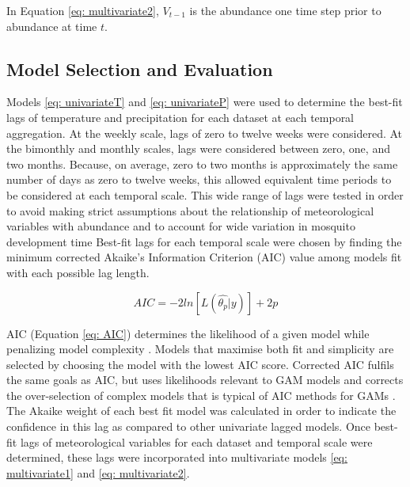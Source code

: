 In Equation \ref{eq: multivariate2}, $V_{t-1}$ is the abundance one time step prior to abundance at time $t$. 


\subsection{Model Selection and Evaluation}

Models \ref{eq: univariateT} and \ref{eq: univariateP} were used to determine the best-fit lags of temperature and precipitation for each dataset at each temporal aggregation. At the weekly scale, lags of zero to twelve weeks were considered. At the bimonthly and monthly scales, lags were considered between zero, one, and two months. Because, on average, zero to two months is approximately the same number of days as zero to twelve weeks, this allowed equivalent time periods to be considered at each temporal scale. This wide range of lags were tested in order to avoid making strict assumptions about the relationship of meteorological variables with abundance and to account for wide variation in mosquito development time \citep{Barrera1996, Beck-Johnson2013} Best-fit lags for each temporal scale were chosen by finding the minimum corrected Akaike's Information Criterion (AIC) value among models fit with each possible lag length. 

\begin{equation}
	AIC = -2ln[L(\hat{\theta_{p}}|y)] + 2p
	\label{eq: AIC}
\end{equation}




AIC (Equation \ref{eq: AIC}) determines the likelihood of a given model while penalizing model complexity \citep{JOHNSON2004101}. Models that maximise both fit and simplicity are selected by choosing the model with the lowest AIC score. Corrected AIC fulfils the same goals as AIC, but uses likelihoods relevant to GAM models and corrects the over-selection of complex models that is typical of AIC methods for GAMs \citep{Greven2010, Wood2016}. 
The Akaike weight of each best fit model was calculated in order to indicate the confidence in this lag as compared to other univariate lagged models. Once best-fit lags of meteorological variables for each dataset and temporal scale were determined, these lags were incorporated into multivariate models \ref{eq: multivariate1} and \ref{eq: multivariate2}. 


